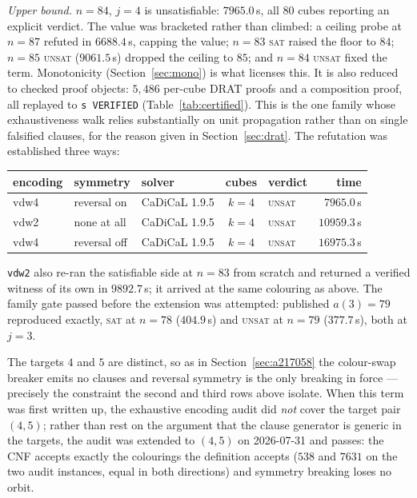 \documentclass[12pt]{article}
\theoremstyle{remark}
\begin{document}
\emph{Upper bound.} $n=84$, $j=4$ is unsatisfiable: $7965.0$\,s, all $80$
cubes reporting an explicit verdict. The value was bracketed rather than
climbed: a ceiling probe at $n=87$ refuted in $6688.4$\,s, capping the value;
$n=83$ \textsc{sat} raised the floor to $84$; $n=85$ \textsc{unsat}
($9061.5$\,s) dropped the ceiling to $85$; and $n=84$ \textsc{unsat} fixed
the term. Monotonicity (Section~\ref{sec:mono}) is what licenses this. It is also
reduced to checked proof objects: $5{,}486$ per-cube DRAT proofs and a
composition proof, all replayed to \texttt{s VERIFIED}
(Table~\ref{tab:certified}). This is the one family whose exhaustiveness walk
relies substantially on unit propagation rather than on single falsified
clauses, for the reason given in Section~\ref{sec:drat}. The
refutation was established three ways:

\begin{center}
\begin{tabular}{lllclr}
\toprule
encoding & symmetry & solver & cubes & verdict & time \\
\midrule
vdw4 & reversal on & CaDiCaL 1.9.5 & $k=4$ & \textsc{unsat} & $7965.0$\,s \\
vdw2 & none at all & CaDiCaL 1.9.5 & $k=4$ & \textsc{unsat} & $10959.3$\,s \\
vdw4 & reversal off & CaDiCaL 1.9.5 & $k=4$ & \textsc{unsat} & $16975.3$\,s \\
\bottomrule
\end{tabular}
\end{center}

\noindent \texttt{vdw2} also re-ran the satisfiable side at $n=83$ from
scratch and returned a verified witness of its own in $9892.7$\,s; it arrived
at the same colouring as above. The family gate passed before the extension
was attempted: published $a(3)=79$ reproduced exactly, \textsc{sat} at
$n=78$ ($404.9$\,s) and \textsc{unsat} at $n=79$ ($377.7$\,s), both at $j=3$.

The targets $4$ and $5$ are distinct, so as in Section~\ref{sec:a217058} the
colour-swap breaker emits no clauses and reversal symmetry is the only
breaking in force --- precisely the constraint the second and third rows
above isolate. When this term was first written up, the exhaustive encoding
audit did \emph{not} cover the target pair $(4,5)$; rather than rest on the
argument that the clause generator is generic in the targets, the audit was
extended to $(4,5)$ on 2026-07-31 and passes: the CNF accepts exactly the
colourings the definition accepts ($538$ and $7631$ on the two audit
instances, equal in both directions) and symmetry breaking loses no orbit.
\end{document}
